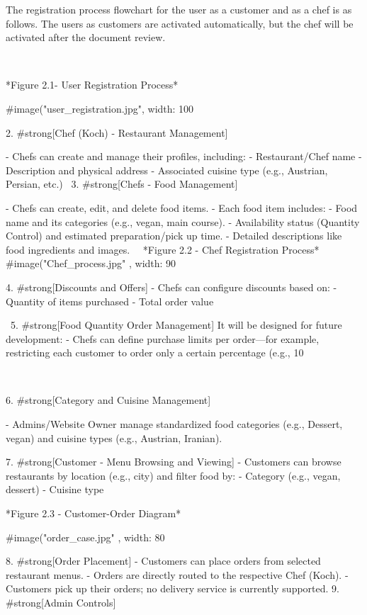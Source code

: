 The registration process flowchart for the user as a customer and as a chef is as follows. The users as customers are activated automatically, but the chef will be activated after the document review.

\

*Figure 2.1- User Registration Process*
\

#image("user_registration.jpg", width: 100%

2. #strong[Chef (Koch) - Restaurant Management]

  - Chefs can create and manage their profiles, including:
     - Restaurant/Chef name
     - Description and physical address
    - Associated cuisine type (e.g., Austrian, Persian, etc.)
\
3. #strong[Chefs - Food Management]

   - Chefs can create, edit, and delete food items.
    - Each food item includes:
    - Food name and its categories (e.g., vegan, main course).
    - Availability status (Quantity Control) and estimated preparation/pick up time.
    - Detailed descriptions like food ingredients and images.
    \
    \
*Figure 2.2 - Chef Registration Process*
#image("Chef_process.jpg" , width: 90%
\
 
4. #strong[Discounts and Offers]
  - Chefs can configure discounts based on:
    - Quantity of items purchased
    - Total order value
 
  \
5. #strong[Food Quantity Order Management]
It will be designed for future development: 
    - Chefs can define purchase limits per order—for example, restricting each customer to order only a certain percentage (e.g., 10%

  \
  
    6. #strong[Category and Cuisine Management]

  - Admins/Website Owner manage standardized food categories (e.g., Dessert, vegan) and cuisine types (e.g., Austrian, Iranian).
\

7. #strong[Customer - Menu Browsing and Viewing]
  - Customers can browse restaurants by location (e.g., city) and filter food by:
    - Category (e.g., vegan, dessert)
    - Cuisine type
  \
  
*Figure 2.3 - Customer-Order Diagram*

#image("order_case.jpg" , width: 80%


8. #strong[Order Placement]
  - Customers can place orders from selected restaurant menus.
  - Orders are directly routed to the respective Chef (Koch).
  - Customers pick up their orders; no delivery service is currently supported.
9. #strong[Admin Controls]

